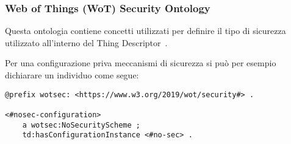 \subsubsection{Web of Things (WoT) Security Ontology}
Questa ontologia contiene concetti utilizzati per definire il tipo di sicurezza utilizzato all'interno del Thing Descriptor~\cite{WebofThi54:online}.

\noindent Per una configurazione priva meccanismi di sicurezza si può per esempio dichiarare un individuo come segue:
\begin{verbatim}
@prefix wotsec: <https://www.w3.org/2019/wot/security#> .

<#nosec-configuration>
	a wotsec:NoSecurityScheme ;
	td:hasConfigurationInstance <#no-sec> .
\end{verbatim}
